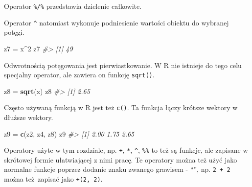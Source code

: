 \documentclass[paper=6in:9in,pagesize=pdftex,headinclude=on,footinclude=on,10pt]{scrbook}
\newenvironment{Shaded}{\begin{snugshade}}{\end{snugshade}}
\newcommand{\CommentTok}[1]{\textcolor[rgb]{0.56,0.35,0.01}{\textit{#1}}}
\newcommand{\DecValTok}[1]{\textcolor[rgb]{0.00,0.00,0.81}{#1}}
\newcommand{\KeywordTok}[1]{\textcolor[rgb]{0.13,0.29,0.53}{\textbf{#1}}}
\newcommand{\NormalTok}[1]{#1}
\newcommand{\OperatorTok}[1]{\textcolor[rgb]{0.81,0.36,0.00}{\textbf{#1}}}
\newcommand{\StringTok}[1]{\textcolor[rgb]{0.31,0.60,0.02}{#1}}
\let\BeginKnitrBlock\begin \let\EndKnitrBlock\end
\begin{document}
\begin{Shaded}
\end{Shaded}

Operator \texttt{\%/\%} przedstawia dzielenie całkowite.

\begin{Shaded}
\end{Shaded}

Operator \texttt{\^{}} natomiast wykonuje podniesienie wartości obiektu do wybranej potęgi.

\begin{Shaded}
\begin{Highlighting}[]
\NormalTok{z7 =}\StringTok{ }\NormalTok{x}\OperatorTok{^}\DecValTok{2}
\NormalTok{z7}
\CommentTok{#> [1] 49}
\end{Highlighting}
\end{Shaded}

Odwrotnością potęgowania jest pierwiastkowanie.
W R nie istnieje do tego celu specjalny operator, ale zawiera on funkcję \texttt{sqrt()}.

\begin{Shaded}
\begin{Highlighting}[]
\NormalTok{z8 =}\StringTok{ }\KeywordTok{sqrt}\NormalTok{(x)}
\NormalTok{z8}
\CommentTok{#> [1] 2.65}
\end{Highlighting}
\end{Shaded}

Często używaną funkcją w R jest też \texttt{c()}.
Ta funkcja łączy krótsze wektory w dłuższe wektory.

\begin{Shaded}
\begin{Highlighting}[]
\NormalTok{z9 =}\StringTok{ }\KeywordTok{c}\NormalTok{(z2, z4, z8)}
\NormalTok{z9}
\CommentTok{#> [1] 2.00 1.75 2.65}
\end{Highlighting}
\end{Shaded}

\BeginKnitrBlock{rmdinfo}
Operatory użyte w tym rozdziale, np. \texttt{+}, \texttt{*}, \texttt{\^{}}, \texttt{\%\%} to też są funkcje, ale zapisane w skrótowej formie ułatwiającej z nimi pracę.
Te operatory można też użyć jako normalne funkcje poprzez dodanie znaku zwanego grawisem - ``\texttt{\textasciigrave{}}'', np. \texttt{2\ +\ 2} można też~zapisać jako \texttt{\textasciigrave{}+\textasciigrave{}(2,\ 2)}.
\EndKnitrBlock{rmdinfo}
\end{document}

